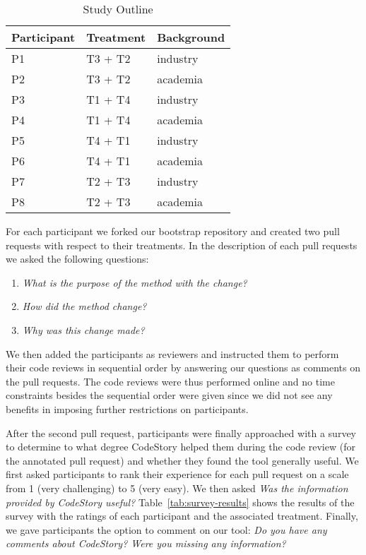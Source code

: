 \documentclass[../manifest.tex]{subfiles}
\begin{document}
\begin{table*}[t]
    \label{tab:study-outline}
    \centering
    \begin{threeparttable}
    \begin{tabular*}{\textwidth}{lll}
    \hline
    \textbf{Participant} & \textbf{Treatment} & \textbf{Background} \\
    \hline
    P1 & T3 + T2 & industry \\
    P2 & T3 + T2 & academia \\
    P3 & T1 + T4 & industry \\
    P4 & T1 + T4 & academia \\
    P5 & T4 + T1 & industry \\
    P6 & T4 + T1 & academia \\
    P7 & T2 + T3 & industry \\
    P8 & T2 + T3 & academia \\
    \hline
    \end{tabular*}
    \end{threeparttable}
    \caption{Study Outline}
\end{table*}

For each participant we forked our bootstrap repository and created two pull requests with respect to their treatments. In the description of each pull requests we asked the following questions:
\begin{enumerate}
  \item \textit{What is the purpose of the method with the change?}
  \item \textit{How did the method change?}
  \item \textit{Why was this change made?}
\end{enumerate}

We then added the participants as reviewers and instructed them to perform their code reviews in sequential order by answering our questions as comments on the pull requests. The code reviews were thus performed online and no time constraints besides the sequential order were given since we did not see any benefits in imposing further restrictions on participants.

After the second pull request, participants were finally approached with a survey to determine to what degree CodeStory helped them during the code review (for the annotated pull request) and whether they found the tool generally useful. We first asked participants to rank their experience for each pull request on a scale from 1 (very challenging) to 5 (very easy). We then asked \textit{Was the information provided by CodeStory useful?} Table~\ref{tab:survey-results} shows the results of the survey with the ratings of each participant and the associated treatment. Finally, we gave participants the option to comment on our tool: \textit{Do you have any comments about CodeStory? Were you missing any information?}
\end{document}
